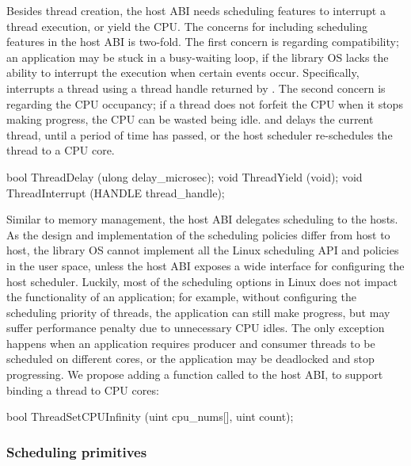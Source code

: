Besides thread creation,
the host ABI needs scheduling features to interrupt a thread execution,
or yield the CPU.
The concerns for including scheduling features
in the host ABI
is two-fold.
The first concern is regarding compatibility;
an application may be stuck in a busy-waiting loop, if the library OS lacks the ability to interrupt the execution when certain events occur.
Specifically,  interrupts a thread using a thread handle
returned by .
The second concern is regarding the CPU occupancy;
if a thread does not forfeit the CPU when it stops making progress,
the CPU can be wasted being idle.
 and 
delays the current thread, until a period of time has passed, or the host scheduler re-schedules the thread to a CPU core.



\begin{paldef}
bool ThreadDelay     (ulong delay_microsec);
void ThreadYield     (void);
void ThreadInterrupt (HANDLE thread_handle);
\end{paldef}



Similar to memory management, the host ABI delegates scheduling to the hosts.
As the design and implementation of the scheduling policies
differ from host to host,
the library OS cannot implement all the Linux scheduling API and policies in the user space,
unless the host ABI exposes a wide interface
for configuring the host scheduler.
Luckily, most of the scheduling options in Linux does not impact
the functionality of an application;
for example, without configuring the scheduling priority of threads,
the application can still make progress,
but may suffer performance penalty due to unnecessary CPU idles.
The only exception happens when an application requires
producer and consumer threads
to be scheduled on different cores,
or the application may be deadlocked and stop progressing.
We propose adding a function called  to the host ABI,
to support binding a thread to CPU cores:

\begin{paldef}
bool ThreadSetCPUInfinity (uint cpu_nums[], uint count);
\end{paldef}


\subsubsection*{Scheduling primitives}


